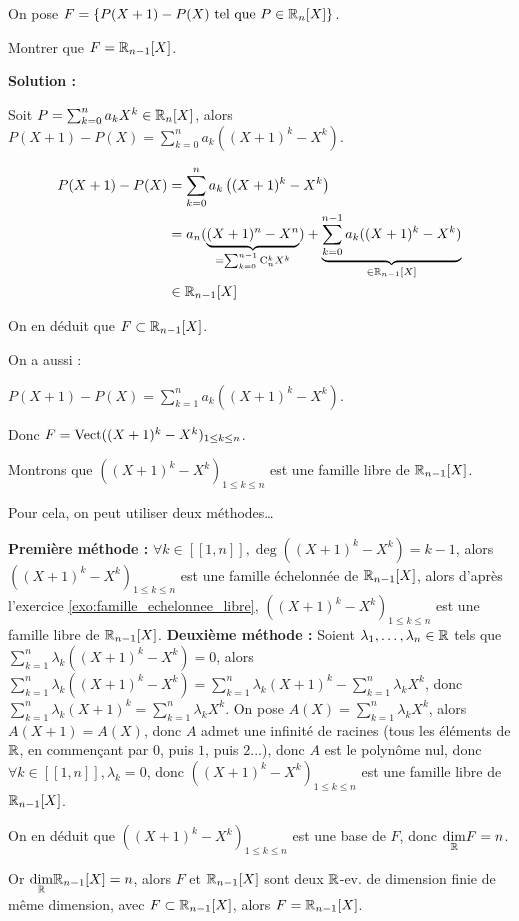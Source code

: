 \documentclass[12pt, a4paper]{report}
\begin{document}
\begin{exercise}
    On pose $F = \{P(X+1) - P(X) \text{ tel que } P \in \mathbb{R}_n[X]\}$.

    Montrer que $F = \mathbb{R}_{n-1}[X]$.

    \textbf{Solution :}

    Soit $P = \sum_{k=0}^n a_k X^k \in \mathbb{R}_n[X]$, alors $P(X+1) - P(X) = \sum_{k=0}^n a_k ((X+1)^k - X^k)$.

    \begin{align*}
        P(X+1) - P(X) &= \sum_{k=0}^n a_k \left( (X+1)^k - X^k \right)\\
        &= a_n(\underbrace{(X+1)^n - X^n}_{=\sum_{k=0}^{n-1} \mathrm{C}_{n}^{k} X^k}) + \underbrace{\sum_{k=0}^{n-1} a_k ((X+1)^k - X^k)}_{\in \mathbb{R}_{n-1}[X]}\\
        &\in \mathbb{R}_{n-1}[X]
    \end{align*}

    On en déduit que $F \subset \mathbb{R}_{n-1}[X]$.

    On a aussi :

    $P(X+1)-P(X) = \sum_{k=1}^{n} a_k ((X+1)^k - X^k)$.

    Donc $F = \mathrm{Vect}((X+1)^k - X^k)_{1 \le k \le n}$.

    Montrons que $((X+1)^k - X^k)_{1 \le k \le n}$ est une famille libre de $\mathbb{R}_{n-1}[X]$.

    Pour cela, on peut utiliser deux méthodes\dots

    \begin{outline}
        \1 \textbf{Première méthode :} $\forall k \in [\![1,n]\!], \deg((X+1)^k - X^k) = k-1$, alors $((X+1)^k - X^k)_{1 \le k \le n}$ est une famille échelonnée de $\mathbb{R}_{n-1}[X]$, alors d'après l'exercice \ref{exo:famille_echelonnee_libre}, $((X+1)^k - X^k)_{1 \le k \le n}$ est une famille libre de $\mathbb{R}_{n-1}[X]$.
        \1 \textbf{Deuxième méthode :} Soient $\lambda_1,\dots,\lambda_n \in \mathbb{R}$ tels que $\sum_{k=1}^n \lambda_k ((X+1)^k - X^k) = 0$, alors $\sum_{k=1}^n \lambda_k ((X+1)^k - X^k) = \sum_{k=1}^n \lambda_k (X+1)^k - \sum_{k=1}^n \lambda_k X^k$, donc $\sum_{k=1}^n \lambda_k (X+1)^k = \sum_{k=1}^n \lambda_k X^k$.
        \2 On pose $A(X) = \sum_{k=1}^n \lambda_k X^k$, alors $A(X+1) = A(X)$, donc $A$ admet une infinité de racines (tous les éléments de $\mathbb{R}$, en commençant par $0$, puis $1$, puis $2$...), donc $A$ est le polynôme nul, donc $\forall k \in [\![1,n]\!], \lambda_k = 0$, donc $((X+1)^k - X^k)_{1 \le k \le n}$ est une famille libre de $\mathbb{R}_{n-1}[X]$.
    \end{outline}

    On en déduit que $((X+1)^k - X^k)_{1 \le k \le n}$ est une base de $F$, donc $\underset{\mathbb{R}}\dim F = n$.

    Or $\underset{\mathbb{R}}\dim \mathbb{R}_{n-1}[X] = n$, alors $F$ et $\mathbb{R}_{n-1}[X]$ sont deux $\mathbb{R}$-ev. de dimension finie de même dimension, avec $F \subset \mathbb{R}_{n-1}[X]$, alors $F = \mathbb{R}_{n-1}[X]$.
\end{exercise}
\end{document}
